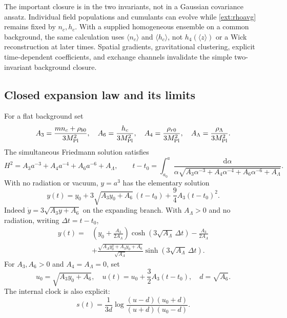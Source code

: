 \documentclass[11pt]{article}
\newcommand{\dd}{\mathrm d}
\newcommand{\mpl}{M_{\rm Pl}}
\begin{document}
The important closure is in the two invariants, not in a Gaussian covariance ansatz. Individual field populations and cumulants can evolve while \eqref{ext:rhoavg} remains fixed by $n_c,h_c$. With a supplied homogeneous ensemble on a common background, the same calculation uses $\langle n_c\rangle$ and $\langle h_c\rangle$, not $h_4(\langle z\rangle)$ or a Wick reconstruction at later times. Spatial gradients, gravitational clustering, explicit time-dependent coefficients, and exchange channels invalidate the simple two-invariant background closure.

\subsection{Closed expansion law and its limits}
For a flat background set
\begin{equation}
 A_3=\frac{mn_c+\rho_{b0}}{3\mpl^2},\quad
 A_6=\frac{h_c}{3\mpl^2},\quad
 A_4=\frac{\rho_{r0}}{3\mpl^2},\quad
 A_\Lambda=\frac{\rho_\Lambda}{3\mpl^2}.
\end{equation}
The simultaneous Friedmann solution satisfies
\begin{equation}
 H^2=A_3a^{-3}+A_4a^{-4}+A_6a^{-6}+A_\Lambda,
 \qquad
 t-t_0=\int_{a_0}^{a}\frac{\dd\alpha}
 {\alpha\sqrt{A_3\alpha^{-3}+A_4\alpha^{-4}+A_6\alpha^{-6}+A_\Lambda}}.
 \label{ext:quad_a}
\end{equation}
With no radiation or vacuum, $y=a^3$ has the elementary solution
\begin{equation}
 \boxed{y(t)=y_0+3\sqrt{A_3y_0+A_6}\,(t-t_0)
                  +\frac94 A_3(t-t_0)^2.}\label{ext:analytic_a}
\end{equation}
Indeed $\dot y=3\sqrt{A_3y+A_6}$ on the expanding branch. With $A_\Lambda>0$ and no radiation, writing $\Delta t=t-t_0$,
\begin{align}
 y(t)={}&\left(y_0+\frac{A_3}{2A_\Lambda}\right)
             \cosh(3\sqrt{A_\Lambda}\,\Delta t)
 -\frac{A_3}{2A_\Lambda}\nonumber\\
 &+\frac{\sqrt{A_\Lambda y_0^2+A_3y_0+A_6}}{\sqrt{A_\Lambda}}
             \sinh(3\sqrt{A_\Lambda}\,\Delta t).
 \label{ext:analytic_lambda}
\end{align}
For $A_3,A_6>0$ and $A_4=A_\Lambda=0$, set
\begin{equation}
 u_0=\sqrt{A_3y_0+A_6},\quad u(t)=u_0+\frac32 A_3(t-t_0),\quad d=\sqrt{A_6}.
\end{equation}
The internal clock is also explicit:
\begin{equation}
 s(t)=\frac{1}{3d}\log\frac{(u-d)(u_0+d)}{(u+d)(u_0-d)}.
 \label{ext:s_explicit}
\end{equation}
\end{document}
